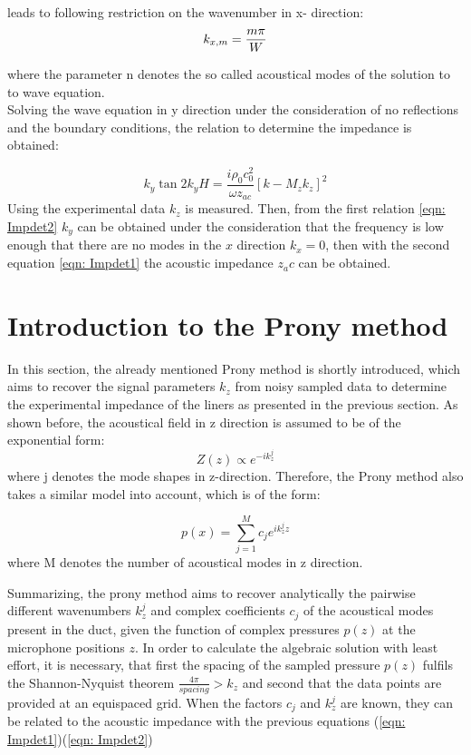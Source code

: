 \documentclass[11pt]{report} %
\begin{document}
leads to following restriction on the wavenumber in x- direction: 
\begin{equation}
k_{x,m}=\frac{m\pi}{W}\\
\end{equation}

where the parameter n denotes the so called acoustical modes of the solution to to wave equation.\\
Solving the wave equation in y direction under the consideration of no reflections and the boundary conditions, the relation to determine the impedance is obtained: 

\begin{equation}\label{eqn: Impdet1}
    k_y \tan 2k_y H = \frac{i \rho_0 c_0^2}{\omega z_{ac}} \left[k-M_zk_z\right]^2
\end{equation}
Using the experimental data $k_z$ is measured. 
Then, from the first relation \ref{eqn: Impdet2} $k_y$ can be obtained under the consideration that the frequency is low enough that there are no modes in the $x$ direction $k_x = 0$, then with the second equation \ref{eqn: Impdet1} the acoustic impedance $z_ac$ can be obtained.

\section{Introduction to the Prony method}
In this section, the already mentioned Prony method is shortly introduced, which aims to recover the signal parameters $k_z$ from noisy sampled data to determine the experimental impedance of the liners as presented in the previous section.
As shown before, the acoustical field in z direction is assumed to be of the exponential form:
\begin{equation}
Z(z)\propto e^{-ik_z^j}
\end{equation}
where j denotes the mode shapes in z-direction.
Therefore, the Prony method also takes a similar model into account, which is of the form: 

\begin{equation}\label{eqn: expsum}
 p(x)=\sum\limits_{j=1}^M c_{j}e^{ik_z^jz} 
\end{equation}
where M denotes the number of acoustical modes in z direction. 

Summarizing, the prony method aims to recover analytically the pairwise different wavenumbers $k_z^{j}$ and complex coefficients $c_{j}$ of the acoustical modes present in the duct, given the function of complex pressures $p(z)$ at the microphone positions $z$.
In order to calculate the algebraic solution with least effort, it is necessary, that first the spacing of the sampled pressure $p(z)$ fulfils the Shannon-Nyquist theorem $\frac{4\pi}{spacing}>k_z$ and second that the data points are provided at an equispaced grid.
When the factors $c_j$ and $k_z^j$ are known, they can be related to the acoustic impedance with the previous equations (\ref{eqn: Impdet1})(\ref{eqn: Impdet2})
 
\end{document}
